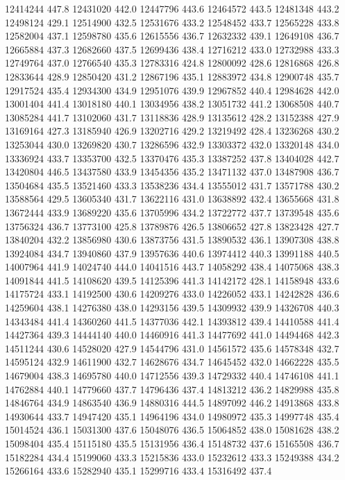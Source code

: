12414244 447.8
12431020 442.0
12447796 443.6
12464572 443.5
12481348 443.2
12498124 429.1
12514900 432.5
12531676 433.2
12548452 433.7
12565228 433.8
12582004 437.1
12598780 435.6
12615556 436.7
12632332 439.1
12649108 436.7
12665884 437.3
12682660 437.5
12699436 438.4
12716212 433.0
12732988 433.3
12749764 437.0
12766540 435.3
12783316 424.8
12800092 428.6
12816868 426.8
12833644 428.9
12850420 431.2
12867196 435.1
12883972 434.8
12900748 435.7
12917524 435.4
12934300 434.9
12951076 439.9
12967852 440.4
12984628 442.0
13001404 441.4
13018180 440.1
13034956 438.2
13051732 441.2
13068508 440.7
13085284 441.7
13102060 431.7
13118836 428.9
13135612 428.2
13152388 427.9
13169164 427.3
13185940 426.9
13202716 429.2
13219492 428.4
13236268 430.2
13253044 430.0
13269820 430.7
13286596 432.9
13303372 432.0
13320148 434.0
13336924 433.7
13353700 432.5
13370476 435.3
13387252 437.8
13404028 442.7
13420804 446.5
13437580 433.9
13454356 435.2
13471132 437.0
13487908 436.7
13504684 435.5
13521460 433.3
13538236 434.4
13555012 431.7
13571788 430.2
13588564 429.5
13605340 431.7
13622116 431.0
13638892 432.4
13655668 431.8
13672444 433.9
13689220 435.6
13705996 434.2
13722772 437.7
13739548 435.6
13756324 436.7
13773100 425.8
13789876 426.5
13806652 427.8
13823428 427.7
13840204 432.2
13856980 430.6
13873756 431.5
13890532 436.1
13907308 438.8
13924084 434.7
13940860 437.9
13957636 440.6
13974412 440.3
13991188 440.5
14007964 441.9
14024740 444.0
14041516 443.7
14058292 438.4
14075068 438.3
14091844 441.5
14108620 439.5
14125396 441.3
14142172 428.1
14158948 433.6
14175724 433.1
14192500 430.6
14209276 433.0
14226052 433.1
14242828 436.6
14259604 438.1
14276380 438.0
14293156 439.5
14309932 439.9
14326708 440.3
14343484 441.4
14360260 441.5
14377036 442.1
14393812 439.4
14410588 441.4
14427364 439.3
14444140 440.0
14460916 441.3
14477692 441.0
14494468 442.3
14511244 430.6
14528020 427.9
14544796 431.0
14561572 435.6
14578348 432.7
14595124 432.9
14611900 432.7
14628676 434.7
14645452 432.0
14662228 435.5
14679004 438.3
14695780 440.0
14712556 439.3
14729332 440.4
14746108 441.1
14762884 440.1
14779660 437.7
14796436 437.4
14813212 436.2
14829988 435.8
14846764 434.9
14863540 436.9
14880316 444.5
14897092 446.2
14913868 433.8
14930644 433.7
14947420 435.1
14964196 434.0
14980972 435.3
14997748 435.4
15014524 436.1
15031300 437.6
15048076 436.5
15064852 438.0
15081628 438.2
15098404 435.4
15115180 435.5
15131956 436.4
15148732 437.6
15165508 436.7
15182284 434.4
15199060 433.3
15215836 433.0
15232612 433.3
15249388 434.2
15266164 433.6
15282940 435.1
15299716 433.4
15316492 437.4
